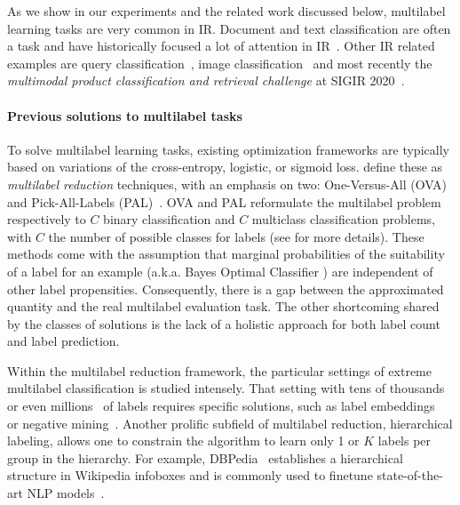 As we show in our experiments and the related work discussed below, multilabel learning tasks are very common in \ac{IR}. Document and text classification are often a  task and have historically focused a lot of attention in \ac{IR}~\cite{IRClassStat, textCategorization, statTextCategorization, documentClassification}. Other \ac{IR} related examples are query classification~\cite{queryClassification, introIR}, image classification~\cite{imageClassification, faceDetection} and most recently the \textit{multimodal product classification and retrieval challenge} at SIGIR 2020~\cite{Amoualian2020SIGIR2E}. 
\fi

\paragraph{Previous solutions to multilabel tasks}
To solve multilabel learning tasks, existing optimization frameworks are typically based on variations of the cross-entropy, logistic, or sigmoid loss. \citeauthor{multilabelReduction} define these as \emph{multilabel reduction} techniques, with an emphasis on two: One-Versus-All (OVA) and Pick-All-Labels (PAL)~\cite{multilabelReduction}. OVA and PAL reformulate the multilabel problem respectively to $C$ binary classification and $C$ multiclass classification problems, with $C$ the number of possible classes for labels (see  for more details). These methods come with the assumption that marginal probabilities of the suitability of a label for an example (a.k.a. Bayes Optimal Classifier ) are independent of other label propensities. Consequently, there is a gap between the approximated quantity and the real multilabel evaluation task. The other shortcoming shared by the  classes of solutions is the lack of a holistic approach for both label count and label prediction.

Within the multilabel reduction framework, the particular settings of extreme multilabel classification is studied intensely. That setting with tens of thousands~\cite{extremeClassification} or even millions~\cite{millionsOfLabels, extremeMilliionsSlice} of labels requires specific solutions, such as label embeddings~\cite{extremeMultilabelEmbeddings} or negative mining~\cite{stochasticNegativeMining}. Another prolific subfield of multilabel reduction, hierarchical labeling, allows one to constrain the algorithm to learn only 1 or $K$ labels per group in the hierarchy. For example, DBPedia~\citep{lehmann2015dbpedia} establishes a hierarchical structure in Wikipedia infoboxes and is commonly used to finetune state-of-the-art NLP models~\citep[see, e.g.,][]{XLNet, ULMFit}. 

